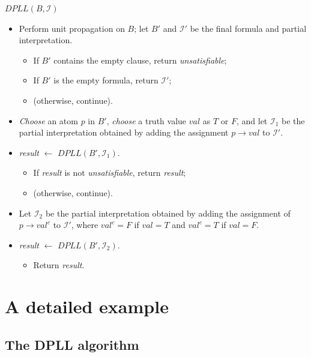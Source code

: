\documentclass[11pt]{report}
\begin{document}
\noindent $\textit{DPLL}(B,\mathcal{I})$
\begin{itemize}

\item Perform unit propagation on $B$; let $B'$ and $\mathcal{I}'$ be
the final formula and partial interpretation.

\begin{itemize}
\item If $B'$ contains the empty clause, return \emph{unsatisfiable};
\item If $B'$ is the empty formula, return $\mathcal{I}'$;
\item (otherwise, continue).
\end{itemize}
\item \emph{Choose} an atom $p$ in $B'$, \emph{choose} a truth value
$\textit{val}$ as $T$ or $F$, and let $\mathcal{I}_1$ be the
partial interpretation obtained by adding the assignment
$p\rightarrow \textit{val}$  to $\mathcal{I}'$. 

\item \textit{result} $\leftarrow$ $\textit{DPLL}(B',\mathcal{I}_1)$.
\begin{itemize}
\item If \textit{result} is not \emph{unsatisfiable}, return \textit{result};
\item (otherwise, continue).
\end{itemize}

\item Let $\mathcal{I}_2$ be the partial interpretation obtained by
adding the assignment of $p\rightarrow \textit{val}^c$ to
$\mathcal{I}'$, where $\textit{val}^c = F$ if $\textit{val} = T$ and
$\textit{val}^c = T$ if $\textit{val} = F$.

\item \textit{result} $\leftarrow$ $\textit{DPLL}(B',\mathcal{I}_2)$.
\begin{itemize}
\item Return \textit{result}.
\end{itemize}
\end{itemize}



\chapter{A detailed example}\label{ch.mlm}

\section{The DPLL algorithm}
\end{document}
